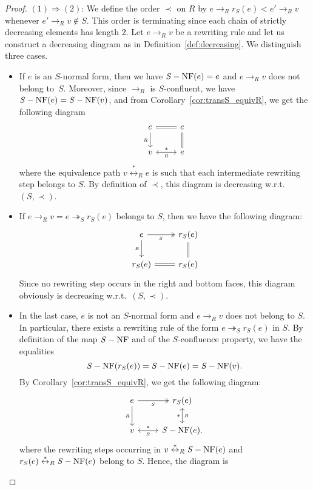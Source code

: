 \documentclass[11pt]{article}
\theoremstyle{definition}
\newcommand\rewR{\to_R}
\newcommand\parS{\twoheadrightarrow_S}
\newcommand\equivR{\overset{*}{\leftrightarrow}_R}
\DeclareMathOperator{\SNF}{{\it S}-NF}
\begin{document}
\begin{proof}
  $(1)\Rightarrow (2)$: We define the order $\prec$ on $R$ by
  $e\rewR r_S(e)<e'\rewR v$ whenever $e'\rewR v\notin S$. This order is
  terminating since each chain of strictly decreasing elements has length
  $2$. Let $e\rewR v$ be a rewriting rule and let us construct a
  decreasing diagram as in Definition~\ref{def:decreasing}. We
  distinguish three cases.
  \begin{itemize}
  \item If $e$ is an $S$-normal form, then we have $\SNF(e)=e$ and
    $e\rewR v$ does not belong to~$S$. Moreover, since $\rewR$ is
    $S$-confluent, we have $\SNF(e)=\SNF(v)$, and from
    Corollary~\ref{cor:transS_equivR}, we get the following diagram
    \[\begin{tikzcd}
    e\ar[d, "_R"']\ar[r, equal] &
    e\ar[d, equal]\\
    v\ar[r, "*", leftrightarrow, "_R"'] & e
    \end{tikzcd}\]
    where the equivalence path $v \equivR e$ is such that each
    intermediate rewriting step belongs to $S$. By definition of $\prec$,
    this diagram is decreasing w.r.t.\ $(S,\prec)$.
  \item If $e\rewR v=e\parS r_S(e)$ belongs to $S$, then we have the 
    following diagram:
    \[\begin{tikzcd}
    e\ar[r, twoheadrightarrow, "_S"']\ar[d, "_R"']
    & r_S(e) \ar[equal, d]\\
    r_S(e)\ar[r, equal] & r_S(e)
    \end{tikzcd}\]
    Since no rewriting step occurs in the right and bottom faces, this
    diagram obviously is decreasing w.r.t.\ $(S,\prec)$.
  \item In the last case, $e$ is not an $S$-normal form and $e\rewR v$
    does not belong to $S$. In particular, there exists a rewriting rule
    of the form $e\parS r_S(e)$ in $S$. By definition of
    the map $\SNF$ and of the $S$-confluence property, we have the
    equalities
    \[\SNF(r_S(e))=\SNF(e)=\SNF(v).
    \smallskip\]
    By Corollary~\ref{cor:transS_equivR}, we get the following
    diagram:
    \[\begin{tikzcd}
    e\ar[d, "_R"']\ar[r, twoheadrightarrow, "_S"'] &
    r_S(e) \ar["_R", "*"', leftrightarrow, d] \\
    v \ar[r, "_R"',leftrightarrow, "*"] & \SNF (e).
    \end{tikzcd}\]
    where the rewriting steps occurring in $v\equivR\SNF(e)$ and
    $r_S(e)\equivR\SNF(e)$ belong to $S$. Hence, the diagram is

\end{itemize}
\end{proof}
\end{document}
